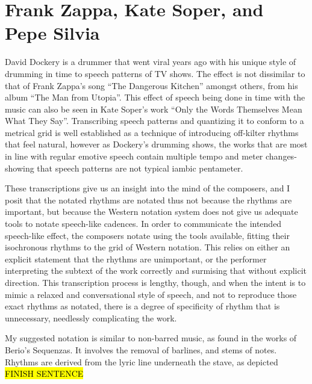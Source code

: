 
\section{Frank Zappa, Kate Soper, and Pepe Silvia}
David Dockery is a drummer that went viral years ago with his unique style of drumming in time to speech patterns of TV shows.\autocite[]{daviddockeryPepeSilviaDrums2017}
The effect is not dissimilar to that of Frank Zappa's song ``The Dangerous Kitchen'' amongst others, from his album ``The Man from Utopia''.\autocite[]{zappa}
This effect of speech being done in time with the music can also be seen in Kate Soper's work ``Only the Words Themselves Mean What They Say''.\autocite[]{soper}
Transcribing speech patterns and quantizing it to conform to a metrical grid is well established as a technique of introducing off-kilter rhythms that feel natural, however as Dockery's drumming shows, the works that are most in line with regular emotive speech contain multiple tempo and meter changes- 
showing that speech patterns are not typical iambic pentameter.

These transcriptions give us an insight into the mind of the composers, and I posit that the notated rhythms are notated thus not because the rhythms are important, but because the Western notation system does not give us adequate tools to notate speech-like cadences. 
In order to communicate the intended speech-like effect, the composers notate using the tools available, fitting their isochronous rhythms to the grid of Western notation.
This relies on either an explicit statement that the rhythms are unimportant, or the performer interpreting the subtext of the work correctly and surmising that without explicit direction.
This transcription process is lengthy, though, and when the intent is to mimic a relaxed and conversational style of speech, and not to reproduce those exact rhythms as notated, there is a degree of specificity of rhythm that is unnecessary, needlessly complicating the work.

My suggested notation is similar to non-barred music, as found in the works of Berio's Sequenzas.\autocite[]{berio}
It involves the removal of barlines, and stems of notes. 
Rhythms are derived from the lyric line underneath the stave, as depicted \hl{FINISH SENTENCE}

